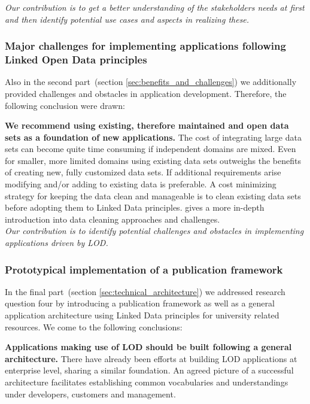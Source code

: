 \documentclass{article}
\begin{document}
\textit{Our contribution is to get a better understanding of the stakeholders needs at first and then identify potential use cases and aspects in realizing these.}

\subsubsection{Major challenges for implementing applications following Linked Open Data principles}
Also in the second part~(section \ref{sec:benefits_and_challenges}) we additionally provided challenges and obstacles in application development. 
Therefore, the following conclusion were drawn: 

\textbf{We recommend using existing, therefore maintained and open data sets as a foundation of new applications.}
The cost of integrating large data sets can become quite time consuming if independent domains are mixed. Even for smaller, more limited domains using existing data sets outweighs the benefits of creating new, fully customized data sets. If additional requirements arise modifying and/or adding to existing data is preferable. A cost minimizing strategy for keeping the data clean and manageable is to clean existing data sets before adopting them to Linked Data principles. \citet{artcle:rahm2000data} gives a more in-depth introduction into data cleaning approaches and challenges. \\

\textit{Our contribution is to identify potential challenges and obstacles in implementing applications driven by LOD.}

\subsubsection{Prototypical implementation of a publication framework}
In the final part~(section \ref{sec:technical_architecture}) we addressed research question four by introducing a publication framework as well as a general application architecture using Linked Data principles for university related resources. 
We come to the following conclusions:

\textbf{Applications making use of LOD should be built following a general architecture.}
There have already been efforts at building LOD applications at enterprise level, sharing a similar foundation. An agreed picture of a successful architecture facilitates establishing common vocabularies and understandings under developers, customers and management. \\
\end{document}
